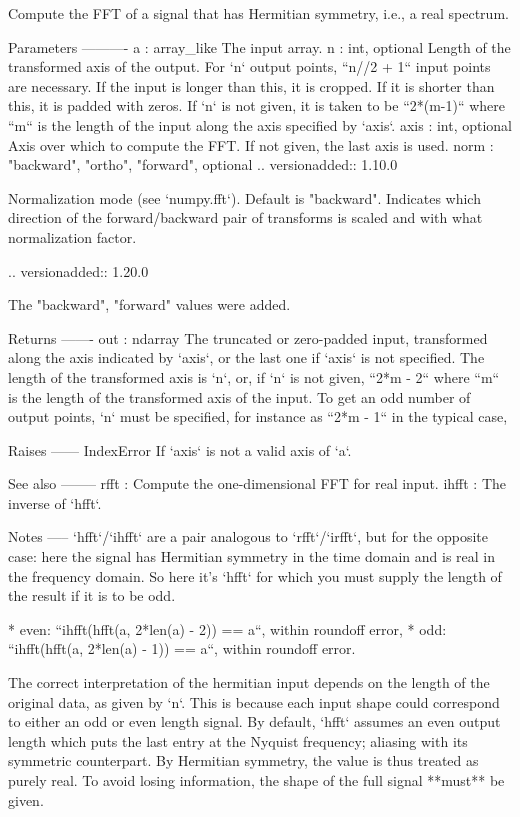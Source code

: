 \begin{DoxyVerb}Compute the FFT of a signal that has Hermitian symmetry, i.e., a real
spectrum.

Parameters
----------
a : array_like
    The input array.
n : int, optional
    Length of the transformed axis of the output. For `n` output
    points, ``n//2 + 1`` input points are necessary.  If the input is
    longer than this, it is cropped.  If it is shorter than this, it is
    padded with zeros.  If `n` is not given, it is taken to be ``2*(m-1)``
    where ``m`` is the length of the input along the axis specified by
    `axis`.
axis : int, optional
    Axis over which to compute the FFT. If not given, the last
    axis is used.
norm : {"backward", "ortho", "forward"}, optional
    .. versionadded:: 1.10.0

    Normalization mode (see `numpy.fft`). Default is "backward".
    Indicates which direction of the forward/backward pair of transforms
    is scaled and with what normalization factor.

    .. versionadded:: 1.20.0

        The "backward", "forward" values were added.

Returns
-------
out : ndarray
    The truncated or zero-padded input, transformed along the axis
    indicated by `axis`, or the last one if `axis` is not specified.
    The length of the transformed axis is `n`, or, if `n` is not given,
    ``2*m - 2`` where ``m`` is the length of the transformed axis of
    the input. To get an odd number of output points, `n` must be
    specified, for instance as ``2*m - 1`` in the typical case,

Raises
------
IndexError
    If `axis` is not a valid axis of `a`.

See also
--------
rfft : Compute the one-dimensional FFT for real input.
ihfft : The inverse of `hfft`.

Notes
-----
`hfft`/`ihfft` are a pair analogous to `rfft`/`irfft`, but for the
opposite case: here the signal has Hermitian symmetry in the time
domain and is real in the frequency domain. So here it's `hfft` for
which you must supply the length of the result if it is to be odd.

* even: ``ihfft(hfft(a, 2*len(a) - 2)) == a``, within roundoff error,
* odd: ``ihfft(hfft(a, 2*len(a) - 1)) == a``, within roundoff error.

The correct interpretation of the hermitian input depends on the length of
the original data, as given by `n`. This is because each input shape could
correspond to either an odd or even length signal. By default, `hfft`
assumes an even output length which puts the last entry at the Nyquist
frequency; aliasing with its symmetric counterpart. By Hermitian symmetry,
the value is thus treated as purely real. To avoid losing information, the
shape of the full signal **must** be given.


\end{DoxyVerb}

